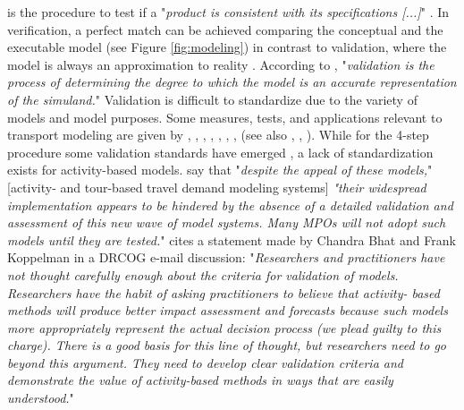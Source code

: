  is the procedure to test if a "\emph{product is consistent with its specifications [...]}" \citet[][p.330]{Petty_SokolowskiBanks_2010}. In verification, a perfect match can be achieved comparing the conceptual and the executable model (see Figure \ref{fig:modeling}) in contrast to validation, where the model is always an approximation to reality \citep[][p.145]{Kleijnen_EJOR_1995}. According to \citet[][p.331]{Petty_SokolowskiBanks_2010}, "\emph{validation is the process of determining the degree to which the model is an accurate representation of the simuland.}" Validation is difficult to standardize due to the variety of models and model purposes. Some measures, tests, and applications relevant to transport modeling are given by \citet[][Table 2]{MilamChao_TRBATPM_2001}, \citet[][]{Lima_TechRep_LMPO_2006}, \citet[][p.155]{KurthEtAl_TRBTDF_2006}, \citet[][p.157]{PendyalaBhat_TRBTDF_2006}, \citet[][p.8]{WegmannEverett_TechRep_CTRUT_2008}, \citet[][]{MilamChao_TRBATPM_2001, RoordaEtAl_TransResA_2008, HawasHameed_TPT_2009, SadekEtAl_TRR_2003, GouliasKitamura_TRR_1992}, \citet[][p.25]{CambridgeSystematics_manual_2008}, \citet[][p.145]{Kleijnen_EJOR_1995} (see also \citet[][]{David_EACSSS_2009}, \citet[][p.56]{SbaytiRoden_ResRep_AASHTO_2010}, \citet[][]{SchifferRossi_TRB_2009}). While for the 4-step procedure some validation standards have emerged \citep[e.g.,][]{BartonAschmanCambridgeSystematics_manual_1997}, a lack of standardization exists for activity-based models. \citet[][]{PendyalaBhat_TRBTDF_2006} say that "\emph{despite the appeal of these models,}" [activity- and tour-based travel demand modeling systems] \emph{"their widespread implementation appears to be hindered by the absence of a detailed validation and assessment of this new wave of model systems. Many MPOs will not adopt such models until they are tested.}" \citet[][]{KurthEtAl_TRBTDF_2006} cites a statement made by Chandra Bhat and Frank Koppelman in a DRCOG e-mail discussion: "\emph{Researchers and practitioners have not thought carefully enough about the criteria for validation of models. Researchers have the habit of asking practitioners to believe that activity- based methods will produce better impact assessment and forecasts because such models more appropriately represent the actual decision process (we plead guilty to this charge). There is a good basis for this line of thought, but researchers need to go beyond this argument. They need to develop clear validation criteria and demonstrate the value of activity-based methods in ways that are easily understood.}"

